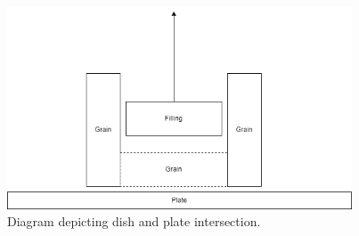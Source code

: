 \begin{figure}[H]
	\centering
	\includegraphics[height=6cm]{Figures/plane-vertical.png}
	\caption{Diagram depicting dish and plate intersection.}
	\label{fig:plate-vertical}
\end{figure}



